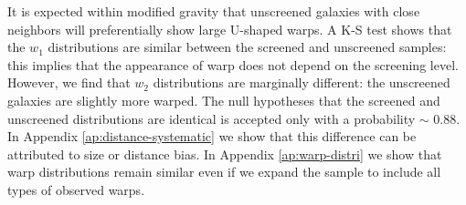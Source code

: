 \documentclass[useAMS,usenatbib,twocolumn]{mn2e}
\begin{document}
It is expected within modified gravity that unscreened galaxies with
close neighbors will preferentially show large U-shaped warps.
A K-S test shows that the $w_1$ distributions are similar between the
screened and unscreened samples: this implies that the appearance of
warp does not depend on the screening level.
However, we find that $w_2$ distributions are
marginally different: the unscreened galaxies are slightly more warped. The
null hypotheses that the screened and unscreened distributions are identical is
accepted only with a probability $\sim$ 0.88.
In Appendix \ref{ap:distance-systematic} we show that this difference can be
attributed to size or
distance bias. In Appendix \ref{ap:warp-distri} we show that
warp distributions remain similar even if we expand the sample to include
all types of observed warps.
\end{document}
